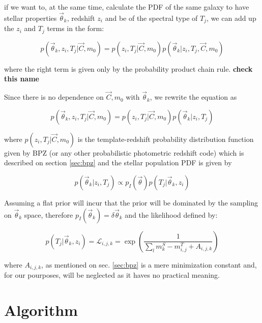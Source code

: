 \documentclass[9pt]{memoir}
\begin{document}
if we want to, at the same time, calculate the PDF of the same galaxy to have stellar properties $\vec{\theta}_k$, redshift $z_i$ and be of the spectral type of $T_j$, we can add up the $z_i$ and $T_j$ terms in the form:

\begin{equation}
p(\vec{\theta}_k, z_i, T_j | \vec{C}, m_0) = p(z_i, T_j|\vec{C}, m_0)p(\vec{\theta}_k|z_i,T_j,\vec{C},m_0)
\end{equation}

where the right term is given only by the probability product chain rule. \textbf{check this name}

Since there is no dependence on $\vec{C}, m_0$ with $\vec{\theta}_k$, we rewrite the equation as

\begin{equation}
p(\vec{\theta}_k, z_i, T_j | \vec{C}, m_0) = p(z_i, T_j|\vec{C}, m_0)p(\vec{\theta}_k|z_i,T_j)
\end{equation}

where $p(z_i, T_j|\vec{C}, m_0)$ is the template-redshift probability distribution function given by BPZ (or any other probabilistic photometric redshift code) which is described on section \ref{sec:bpz} and the stellar population PDF is given by

\begin{equation}
\label{eq:stellar_pop_props}
p(\vec{\theta}_k|z_i,T_j) \propto p_I(\vec{\theta}) p(T_j|\vec{\theta}_k, z_i)
\end{equation}

Assuming a flat prior will incur that the prior will be dominated by the sampling on $\vec{\theta}_k$ space, therefore $p_I (\vec{\theta}_k) = \delta \vec{\theta}_k$ and the likelihood defined by:

\begin{equation}
p(T_j|\vec{\theta}_k, z_i) = \mathcal{L}_{i,j,k} = \exp \left( \frac{1}{\sum_l m^S_k - m^T_{i,j} + A_{i,j,k}} \right)
\end{equation}

where $A_{i,j,k}$, as mentioned on sec. \ref{sec:bpz} is a mere minimization constant and, for our pourposes, will be neglected as it haves no practical meaning.

\section{Algorithm}
\end{document}
